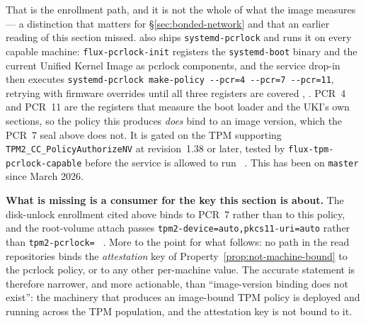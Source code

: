 That is the enrollment path, and it is not the whole of what the image measures --- a distinction
that matters for \S\ref{sec:bonded-network} and that an earlier reading of this section missed.
\ArcaneOS also ships \texttt{systemd-pcrlock} and runs it on every capable machine:
\texttt{flux-\allowbreak{}pcrlock-\allowbreak{}init} registers the \texttt{systemd-boot} binary and the
current Unified Kernel Image as pcrlock components, and the service drop-in then executes
\texttt{systemd-\allowbreak{}pcrlock make-\allowbreak{}policy -\allowbreak{}-\allowbreak{}pcr=4
-\allowbreak{}-\allowbreak{}pcr=7 -\allowbreak{}-\allowbreak{}pcr=11}, retrying with firmware overrides until
all three registers are covered \shipped
{},
.
PCR~4 and PCR~11 are the registers that measure the boot loader and the UKI's own sections, so the
policy this produces \emph{does} bind to an image version, which the PCR~7 seal above does not. It is
gated on the TPM supporting \texttt{TPM2\_CC\_\allowbreak{}Policy\allowbreak{}Authorize\allowbreak{}NV} at
revision~1.38 or later, tested by \texttt{flux-\allowbreak{}tpm-\allowbreak{}pcrlock-\allowbreak{}capable}
before the service is allowed to run
\shipped~.
This has been on \texttt{master} since March 2026.

\textbf{What is missing is a consumer for the key this section is about.} The disk-unlock enrollment
cited above binds to PCR~7 rather than to this policy, and the root-volume attach passes
\texttt{tpm2-\allowbreak{}device=auto,\allowbreak{}pkcs11-\allowbreak{}uri=auto} rather than
\texttt{tpm2-\allowbreak{}pcrlock=}
\shipped~. More to the
point for what follows: no path in the read repositories binds the \emph{attestation} key of
Property~\ref{prop:not-machine-bound} to the pcrlock policy, or to any other per-machine value. The
accurate statement is therefore narrower, and more actionable, than ``image-version binding does not
exist'': the machinery that produces an image-bound TPM policy is deployed and running across the TPM
population, and the attestation key is not bound to it.

